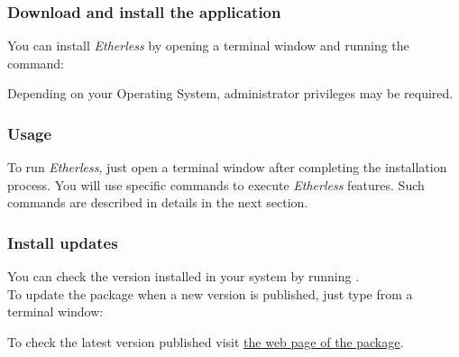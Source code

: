     \subsubsection{Download and install the application}
    You can install \textit{Etherless} by opening a terminal window and running the command:
     \begin{center}
     \end{center}
     Depending on your Operating System, administrator privileges may be required. \\
         \subsubsection{Usage}
      To run \textit{Etherless}, just open a terminal window after completing the installation process. You will use specific commands to execute \textit{Etherless} features. Such commands are described in details in the next section.
      
     \subsubsection{Install updates}
     You can check the version installed in your system by running . \\
     To update the package when a new version is published, just type from a terminal window:
	\begin{center}
	\end{center}
	To check the latest version published visit \href{https://www.npmjs.com/package/@roundabout-team/etherless-cli}{the web page of the package}.
